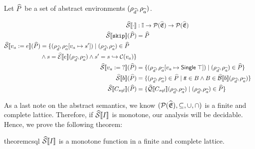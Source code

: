 Let $\widehat{P}$ be a set of abstract environments $(\rho_{\widehat{d}}, \rho_{\widehat{a}})$.

\begin{align}
    \widehat{\mathcal{S}} \llbracket \cdot \rrbracket &: \mathbb{I} \rightarrow \mathcal{P}(\widehat{\mathfrak{E}}) \rightarrow \mathcal{P}(\widehat{\mathfrak{E}}) \\
    \widehat{\mathcal{S}} \llbracket \texttt{skip} \rrbracket(\widehat{P}) &= \widehat{P} \\
    \begin{split}
        \widehat{\mathcal{S}} \llbracket v_a := e \rrbracket(\widehat{P}) &= \{(\rho_{\widehat{d}}, \rho_{\widehat{a}}[v_a \mapsto s']) \mid (\rho_{\widehat{d}}, \rho_{\widehat{a}}) \in \widehat{P} \\
        &\land s = \widehat{\mathcal{E}}\llbracket e \rrbracket(\rho_{\widehat{d}}, \rho_{\widehat{a}}) \land s' = s \hookrightarrow \mathcal{C}(v_a) \}
    \end{split}\\
    \widehat{\mathcal{S}} \llbracket v_a := \; ? \rrbracket(\widehat{P}) &= \{(\rho_{\widehat{d}}, \rho_{\widehat{a}}[v_a \mapsto \mathsf{Single} \; \top]) \mid (\rho_{\widehat{d}}, \rho_{\widehat{a}}) \in \widehat{P} \} \\
    \widehat{\mathcal{S}} \llbracket b \rrbracket(\widehat{P}) &= \{ (\rho_{\widehat{d}}, \rho_{\widehat{a}}) \in \widehat{P} \mid t\!t \in B \land B \in \widehat{\mathcal{B}}\llbracket b \rrbracket(\rho_{\widehat{d}}, \rho_{\widehat{a}}) \} \\
    \widehat{\mathcal{S}} \llbracket C_{sql} \rrbracket(\widehat{P}) &= \{\widehat{\mathcal{Q}}\llbracket C_{sql} \rrbracket(\rho_{\widehat{d}}, \rho_{\widehat{a}}) \mid (\rho_{\widehat{d}}, \rho_{\widehat{a}}) \in \widehat{P} \}
\end{align}

As a last note on the abstract semantics, we know $(\mathcal{P}(\widehat{\mathfrak{E}}), \subseteq, \cup, \cap)$ is a finite and complete lattice.
Therefore, if $\widehat{\mathcal{S}} \llbracket I \rrbracket$ is monotone, our analysis will be decidable.
Hence, we prove the following theorem:
\begin{restatable}{theorem}{csql}\label{thm:csql}
    $\widehat{\mathcal{S}} \llbracket I \rrbracket$ is a monotone function in a finite and complete lattice.
\end{restatable}

